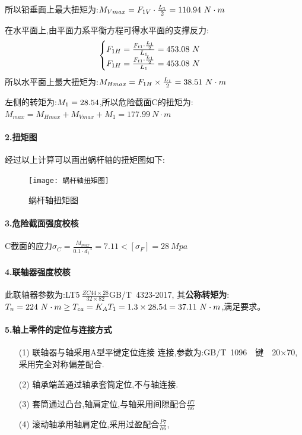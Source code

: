 \documentclass[UTF8,11pt,a4paper,oneside,final,zihao=-4,]{ctexrep}%
\newcommand{\two}[1]{\num[round-mode=places,round-precision=2] #1} %
\begin{document}
	所以铅垂面上最大扭矩为:$M_{Vmax}=F_{1V}\cdot \frac{L_1}{2}=\two{\MVmax}\ N\cdot m$\par
	在水平面上,由平面力系平衡方程可得水平面的支撑反力:
	$$\begin{cases}
		F_{1H}=\frac{F_{t1}\cdot\frac{L_1}{2}}{L_1}=\two{\FIH}\ N \\%
		F_{1H}=\frac{F_{t1}\cdot\frac{L_1}{2}}{L_1}=\two{\FIH}\ N
	\end{cases}$$
	所以水平面上最大扭矩为:$M_{Hmax}=F_{1H}\times \frac{L_1}{2}=\two{\MHmax\ N\cdot m}$\par
	左侧的转矩为:$M_1=\two{\TI}$,所以危险截面C的扭矩为:$M_{max}=M_{Hmax}+M_{Vmax}+M_1=177.99\ N\cdot m$
	\paragraph{2.扭矩图}
	经过以上计算可以画出蜗杆轴的扭矩图如下:\newpage
	\begin{figure}[h]
		
		\centering
		\texttt{[image: 蜗杆轴扭矩图]}
		\caption{蜗杆轴扭矩图}
	\end{figure}
	
	\paragraph{3.危险截面强度校核}
	C截面的应力$\sigma_C=\frac{M_{max}}{0.1\cdot {d_1}^3}=7.11<[\sigma_F]=28\ Mpa$
	\paragraph{4.联轴器强度校核}
	此联轴器参数为:LT5$\ \frac{ZC44\times28}{32\times82}$GB/T\ 4323-2017,
	其\textbf{公称转矩为}:$T_n=224 \ N\cdot m \ge T_{ca}=K_A T_1=1.3\times \two{\TI}=37.11\ N\cdot m$,满足要求。
	\paragraph{5.轴上零件的定位与连接方式}
	\begin{enumerate}
		\item[(1)] 联轴器与轴采用A型平键定位连接%
		连接,参数为:GB/T\ 1096\  \ 键\ \ 20$\times$70,采用完全对称偏差配合.\ \
		\item[(2)]轴承端盖通过轴承套筒定位,不与轴连接.
		\item[(3)]套筒通过凸台,轴肩定位,与轴采用间隙配合$\frac{H7}{h6}$   %
		\item[(4)]滚动轴承用轴肩定位,采用过盈配合$\frac{P7}{h6}$,
	\end{enumerate}
\end{document}
